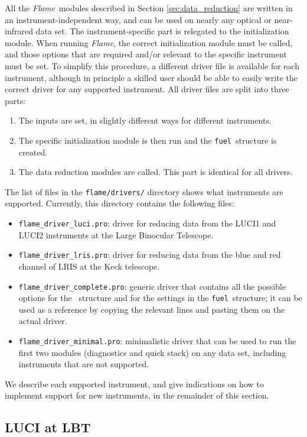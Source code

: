 \documentclass[a4paper]{article}
\newcommand{\flame}{\emph{Flame}}
\newcommand{\fuel}{\texttt{fuel}}
\begin{document}
\begin{sloppypar}
All the \flame\ modules described in Section \ref{sec:data_reduction} are written in an instrument-independent way, and can be used on nearly any optical or near-infrared data set. The instrument-specific part is relegated to the initialization module. When running \flame, the correct initialization module must be called, and those options that are required and/or relevant to the specific instrument must be set. To simplify this procedure, a different driver file is available for each instrument, although in principle a skilled user should be able to easily write the correct driver for any supported instrument. All driver files are split into three parts:
\begin{enumerate}
  \item The inputs are set, in slightly different ways for different instruments.
  \item The specific initialization module is then run and the \fuel\ structure is created.
  \item The data reduction modules are called. This part is identical for all drivers.
\end{enumerate}

The list of files in the \texttt{flame/drivers/} directory shows what instruments are supported. Currently, this directory contains the following files:
\begin{itemize}
  \item[] \texttt{flame\_driver\_luci.pro}: driver for reducing data from the LUCI1 and LUCI2 instruments at the Large Binocular Telescope.
  \item[] \texttt{flame\_driver\_lris.pro}: driver for reducing data from the blue and red channel of LRIS at the Keck telescope.
  \item[] \texttt{flame\_driver\_complete.pro}: generic driver that contains all the possible options for the \ structure and for the settings in the \fuel\ structure; it can be used as a reference by copying the relevant lines and pasting them on the actual driver.
  \item[] \texttt{flame\_driver\_minimal.pro}: minimalistic driver that can be used to run the first two modules (diagnostics and quick stack) on any data set, including instruments that are not supported.
\end{itemize}

We describe each supported instrument, and give indications on how to implement support for new instruments, in the remainder of this section.


\subsection{LUCI at LBT}


\end{sloppypar}
\end{document}
